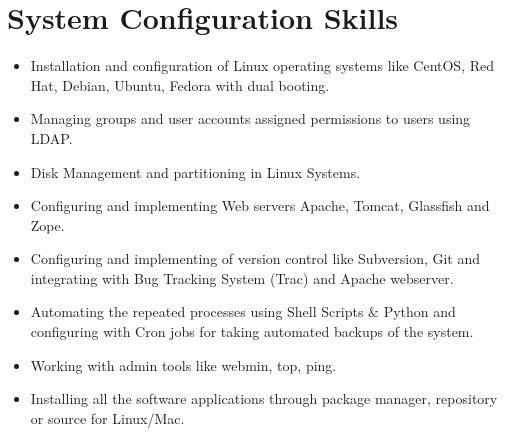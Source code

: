 \documentclass[11pt,a4paper,sans]{moderncv}        %
\begin{document}
\section{System Configuration Skills}
\begin{itemize}
\item Installation and configuration of Linux operating systems like CentOS, Red Hat, Debian, Ubuntu, Fedora with dual booting.
\item Managing groups and user accounts assigned permissions to users using LDAP.
\item Disk Management and partitioning in Linux Systems.
\item Configuring and implementing Web servers Apache, Tomcat, Glassfish and Zope.
\item Configuring and implementing of version control like Subversion, Git and integrating with Bug Tracking
System (Trac) and Apache webserver.
\item Automating the repeated processes using Shell Scripts $\&$ Python and configuring with Cron jobs for taking automated backups of the system.
\item Working with admin tools like webmin, top, ping.
\item Installing all the software applications through package manager, repository or source for Linux/Mac.
\end{itemize}
\pagebreak
~\\
\end{document}

